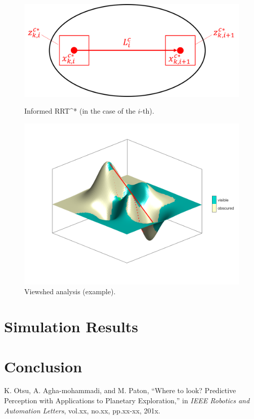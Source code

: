 \documentclass[conference]{IEEEtran}
\begin{document}
\begin{figure}[h]
		\centering
		\includegraphics[width=1.0\columnwidth]{figs/8_11.png}
		\caption{Informed RRT^* (in the case of the $i$-th).}
		\label{fig:8_11}
		\centering
		\includegraphics[width=1.0\columnwidth]{figs/vs.png}
		\caption{Viewshed analysis (example).}
		\label{fig:vs}
\end{figure}






\section{Simulation Results}

\section{Conclusion}

\begin{thebibliography}{1}

K. Otsu, A. Agha-mohammadi, and M. Paton, ``Where to look? Predictive Perception with Applications to Planetary Exploration,'' in {\it IEEE Robotics and Automation Letters}, vol.xx, no.xx, pp.xx-xx, 201x.

\end{thebibliography}
\end{document}
